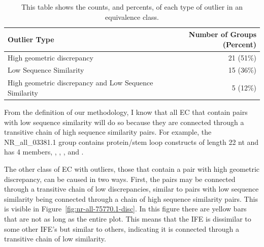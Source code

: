 \begin{table}
  \begin{tabular}{lr}
    \toprule
    Outlier Type & Number of Groups (Percent) \\
    \midrule
    High geometric discrepancy & 21 (51\%) \\
    Low Sequence Similarity & 15 (36\%) \\
    High geometric discrepancy and Low Sequence Similarity & 5 (12\%) \\
    \bottomrule
  \end{tabular}
  \caption{This table shows the counts, and percents, of each type of outlier
  in an equivalence class.}
\label{tab:outlier-types}
\end{table}

From the definition of our methodology, I know that all EC that contain pairs
with low sequence similarity will do so because they are connected through a
transitive chain of high sequence similarity pairs. For example, the
NR\_all\_03381.1 group contains protein/stem loop constructs of length 22 nt and
has 4 members, , , , and
.

The other class of EC with outliers, those that contain a pair with high
geometric discrepancy, can be caused in two ways. First, the pairs may be
connected through a transitive chain of low discrepancies, similar to pairs with
low sequence similarity being connected through a chain of high sequence
similarity pairs. This is visible in Figure~\ref{fig:nr-all-75770.1-disc}. In
this figure there are yellow bars that are not as long as the entire plot. This
means that the IFE is dissimilar to some other IFE's but similar to others,
indicating it is connected through a transitive chain of low similarity.

